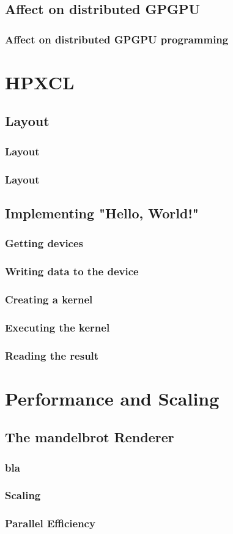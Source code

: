 \documentclass[t]{beamer}
\begin{document}
\subsection{Affect on distributed GPGPU}
\begin{frame}
    \frametitle{Affect on distributed GPGPU programming}
\end{frame}

\section{HPXCL}
\subsection{Layout}
\begin{frame}
    \frametitle{Layout}
\end{frame}

\begin{frame}
    \frametitle{Layout}
\end{frame}


\subsection{Implementing "Hello, World!"}
\begin{frame}
    \frametitle{Getting devices}
\end{frame}

\begin{frame}
    \frametitle{Writing data to the device}
\end{frame}

\begin{frame}
    \frametitle{Creating a kernel}
\end{frame}

\begin{frame}
    \frametitle{Executing the kernel}
\end{frame}

\begin{frame}
    \frametitle{Reading the result}
\end{frame}


\section{Performance and Scaling}

\subsection{The mandelbrot Renderer} %
\begin{frame}
    \frametitle{bla}
\end{frame}

\begin{frame}
    \frametitle{Scaling}
\end{frame}

\begin{frame}
    \frametitle{Parallel Efficiency}
\end{frame}
\end{document}
